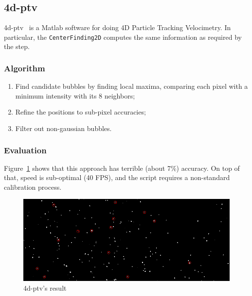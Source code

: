 \subsection{4d-ptv}
\label{sec:locate:fourdptv}

4d-ptv~\cite{fourdptv} is a Matlab software for doing 4D Particle Tracking Velocimetry.
In particular, the \texttt{CenterFinding2D} computes the same information as required by the \locate* step.

\subsubsection{Algorithm}

\begin{enumerate}
	\itemsep 0em
	\item Find candidate bubbles by finding local maxima, comparing each pixel with a minimum intensity with its 8 neighbors;
	\item Refine the positions to sub-pixel accuracies;
	\item Filter out non-gaussian bubbles.
\end{enumerate}

\subsubsection{Evaluation}

Figure~\ref{fig:locate:fourdptv} shows that this approach has terrible (about 7\%) accuracy.
On top of that, speed is sub-optimal (40 FPS), and the script requires a non-standard calibration process.

\begin{figure}
	\centerline{\includegraphics[width=\locateimgsize]{images/locate/4d-ptv.png}}
	\caption{\centering 4d-ptv's result}
	\label{fig:locate:fourdptv}
\end{figure}
